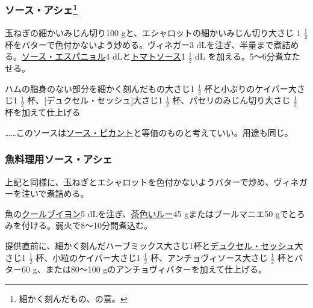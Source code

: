 \begin{recette}
\hypertarget{sauce-hachee}{%
\subsubsection[ソース・アシェ]{\texorpdfstring{ソース・アシェ\footnote{細かく刻んだもの、の意。}}{ソース・アシェ}}\label{sauce-hachee}}



玉ねぎの細かいみじん切り100 gと、エシャロットの細かいみじん切り大さじ 1
\(\frac{1}{2}\) 杯をバターで色付かないよう炒める。ヴィネガー3
dLを注ぎ、半量まで煮詰める。\protect\hyperlink{sauce-espagnole}{ソース・エスパニョル}4
dLと\protect\hyperlink{sauce-tomate}{トマトソース}1 \(\frac{1}{2}\) dL
を加える。5〜6分煮立たせる。

ハムの脂身のない部分を細かく刻んだもの大さじ1 \(\frac{1}{2}\)
杯と小ぶりのケイパー大さじ1 \(\frac{1}{2}\)
杯、{[}デュクセル・セッシュ{]}大さじ1 \(\frac{1}{2}\)
杯、パセリのみじん切り大さじ \(\frac{1}{2}\) 杯を加えて仕上げる

\ldots{}\ldots{}このソースは\protect\hyperlink{sauce-piquante}{ソース・ピカント}と等価のものと考えていい。用途も同じ。

\hypertarget{sauce-hachee-maigre}{%
\subsubsection{魚料理用ソース・アシェ}\label{sauce-hachee-maigre}}



上記と同様に、玉ねぎとエシャロットを色付かないようバターで炒め、ヴィネガーを注いで煮詰める。

魚の\protect\hyperlink{courts-bouillons-de-poisson}{クールブイヨン}5
dLを注ぎ、\protect\hyperlink{roux-brun}{茶色いルー}45
gまたはブールマニエ50 gでとろみを付ける。弱火で8〜10分間煮込む。

提供直前に、細かく刻んだハーブミックス大さじ1杯と\protect\hyperlink{duxelles-seche}{デュクセル・セッシュ}大さじ1
\(\frac{1}{2}\) 杯、小粒のケイパー大さじ1 \(\frac{1}{2}\)
杯、アンチョヴィソース大さじ \(\frac{1}{2}\) 杯とバター60
g、または80〜100 gのアンチョヴィバターを加えて仕上げる。


\end{recette}
